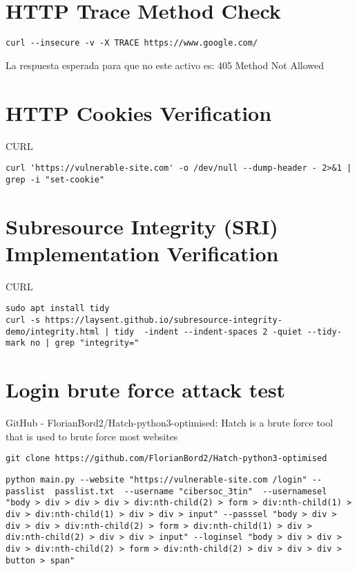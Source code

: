 \section{HTTP Trace Method Check}

\begin{lstlisting}[numbers=none]
curl --insecure -v -X TRACE https://www.google.com/
\end{lstlisting}

La respuesta esperada para que no este activo es: 405 Method Not Allowed

\section{HTTP Cookies Verification}

CURL
\begin{lstlisting}[numbers=none]
curl 'https://vulnerable-site.com' -o /dev/null --dump-header - 2>&1 | grep -i "set-cookie"
\end{lstlisting}

\section{Subresource Integrity (SRI)  Implementation Verification}

CURL
\begin{lstlisting}[numbers=none]
sudo apt install tidy
curl -s https://laysent.github.io/subresource-integrity-demo/integrity.html | tidy  -indent --indent-spaces 2 -quiet --tidy-mark no | grep "integrity="
\end{lstlisting}


\section{Login brute force attack test}

GitHub - FlorianBord2/Hatch-python3-optimised: Hatch is a brute force tool that is used to brute force most websites


\begin{lstlisting}[numbers=none]
	git clone https://github.com/FlorianBord2/Hatch-python3-optimised
\end{lstlisting}


\begin{lstlisting}[numbers=none]
	python main.py --website "https://vulnerable-site.com /login" --passlist  passlist.txt  --username "cibersoc_3tin"  --usernamesel "body > div > div > div > div:nth-child(2) > form > div:nth-child(1) > div > div:nth-child(1) > div > div > input" --passsel "body > div > div > div > div:nth-child(2) > form > div:nth-child(1) > div > div:nth-child(2) > div > div > input" --loginsel "body > div > div > div > div:nth-child(2) > form > div:nth-child(2) > div > div > div > button > span"
\end{lstlisting}


